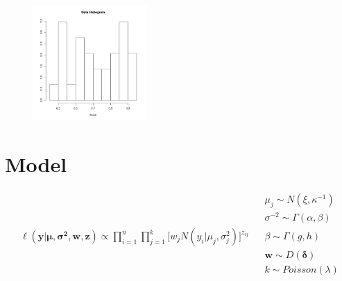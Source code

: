 \documentclass{article}
\begin{document}
\begin{figure}
	\centering
        \includegraphics[width=0.39\textwidth]{dataHist.pdf}	
\end{figure}

\section{Model}
\begin{align}
&~& &\mu_j \sim N(\xi, \kappa^{-1})&\nonumber\\
&~& &\sigma^{-2} \sim \Gamma (\alpha, \beta)& \nonumber\\
&\ell(\bm{y}|\bm{\mu},\bm{\sigma^2}, \bm{w}, \bm{z}) \propto\prod_{i=1}^n \prod_{j=1}^k\Big[ w_j N(y_i|\mu_j, \sigma^2_j) \Big]^{z_{ij}}&  &\beta \sim \Gamma(g, h)&\\
&~& &\bm{w} \sim D(\bm{\delta})&\nonumber\\
&~& &k \sim Poisson(\lambda)&\nonumber
\end{align}
\end{document}
